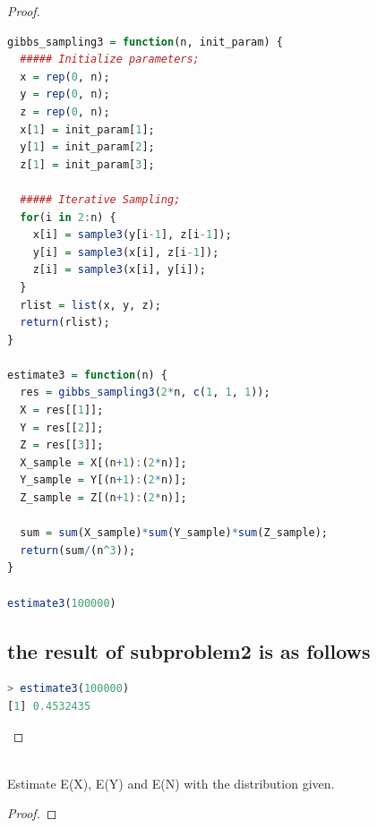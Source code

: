 \documentclass{article}
\newenvironment{problem}[2][Problem]{\begin{trivlist}
\item[\hskip \labelsep {\bfseries #1}\hskip \labelsep {\bfseries #2.}]}{\end{trivlist}}
\begin{document}
\begin{proof}
\begin{lstlisting}[language = {R}]
gibbs_sampling3 = function(n, init_param) {
  ##### Initialize parameters;
  x = rep(0, n);
  y = rep(0, n);
  z = rep(0, n);
  x[1] = init_param[1];
  y[1] = init_param[2];
  z[1] = init_param[3];
  
  ##### Iterative Sampling;
  for(i in 2:n) {
    x[i] = sample3(y[i-1], z[i-1]);
    y[i] = sample3(x[i], z[i-1]);
    z[i] = sample3(x[i], y[i]);
  }
  rlist = list(x, y, z);
  return(rlist);
}

estimate3 = function(n) {
  res = gibbs_sampling3(2*n, c(1, 1, 1));
  X = res[[1]];
  Y = res[[2]];
  Z = res[[3]];
  X_sample = X[(n+1):(2*n)];
  Y_sample = Y[(n+1):(2*n)];
  Z_sample = Z[(n+1):(2*n)];

  sum = sum(X_sample)*sum(Y_sample)*sum(Z_sample);
  return(sum/(n^3));
}

estimate3(100000)
\end{lstlisting}
\subsection{the result of subproblem2 is as follows}
\begin{lstlisting}[language = {R}]
> estimate3(100000)
[1] 0.4532435
\end{lstlisting}
\end{proof}

\begin{problem}{4}
\text{ }\\
Estimate E(X), E(Y) and E(N) with the distribution given.
\end{problem}
\begin{proof}



\end{proof}
\end{document}
